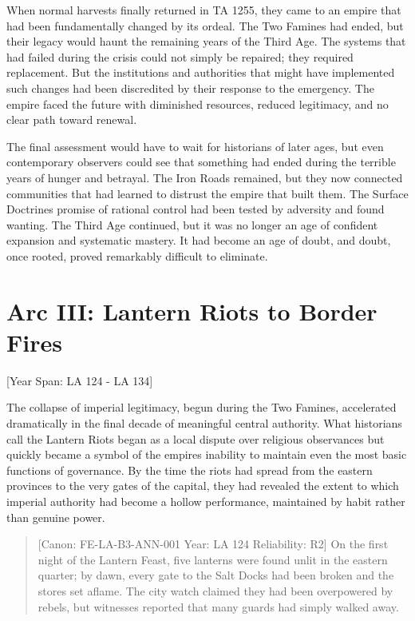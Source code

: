 When normal harvests finally returned in TA 1255, they came to an empire
that had been fundamentally changed by its ordeal. The Two Famines had
ended, but their legacy would haunt the remaining years of the Third
Age. The systems that had failed during the crisis could not simply be
repaired; they required replacement. But the institutions and
authorities that might have implemented such changes had been
discredited by their response to the emergency. The empire faced the
future with diminished resources, reduced legitimacy, and no clear path
toward renewal.

The final assessment would have to wait for historians of later ages,
but even contemporary observers could see that something had ended
during the terrible years of hunger and betrayal. The Iron Roads
remained, but they now connected communities that had learned to
distrust the empire that built them. The Surface
Doctrine\textquotesingle s promise of rational control had been tested
by adversity and found wanting. The Third Age continued, but it was no
longer an age of confident expansion and systematic mastery. It had
become an age of doubt, and doubt, once rooted, proved remarkably
difficult to eliminate.

\section{Arc III: Lantern Riots to Border
Fires}\label{arc-iii-lantern-riots-to-border-fires}

{[}Year Span: LA 124 - LA 134{]}

The collapse of imperial legitimacy, begun during the Two Famines,
accelerated dramatically in the final decade of meaningful central
authority. What historians call the Lantern Riots began as a local
dispute over religious observances but quickly became a symbol of the
empire\textquotesingle s inability to maintain even the most basic
functions of governance. By the time the riots had spread from the
eastern provinces to the very gates of the capital, they had revealed
the extent to which imperial authority had become a hollow performance,
maintained by habit rather than genuine power.

\begin{quote}
{[}Canon: FE-LA-B3-ANN-001 \textbar{} Year: LA 124 \textbar{}
Reliability: R2{]} On the first night of the Lantern Feast, five
lanterns were found unlit in the eastern quarter; by dawn, every gate to
the Salt Docks had been broken and the stores set aflame. The city watch
claimed they had been overpowered by rebels, but witnesses reported that
many guards had simply walked away.
\end{quote}

